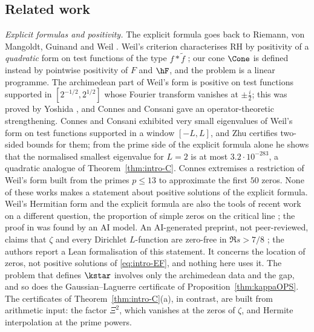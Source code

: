 \subsection{Related work}

\emph{Explicit formulas and positivity.} The explicit formula goes back to Riemann, von Mangoldt, Guinand \cite{Gui48,Gui49} and Weil
\cite{Wei52,Wei72}. Weil's criterion characterises RH by positivity of a \emph{quadratic} form on test functions of the type $f*\tilde f$
\cite{Wei52,Bom00}; our cone $\Cone$ is defined instead by pointwise positivity of $F$ and $\hF$, and the problem is a linear programme. The
archimedean part of Weil's form is positive on test functions supported in $[2^{-1/2},2^{1/2}]$ whose Fourier transform vanishes at
$\pm\frac i2$; this was proved by Yoshida \cite{Yos92}, and Connes and Consani \cite{CC21a} gave an operator-theoretic strengthening. Connes and
Consani \cite{CC23} exhibited very small eigenvalues of Weil's form on test functions supported in a window $[-L,L]$, and Zhu \cite{Zhu26}
certifies two-sided bounds for them; from the prime side of the explicit formula alone he shows that the normalised smallest eigenvalue
for $L=2$ is at most $3.2\cdot10^{-283}$, a quadratic analogue of Theorem~\ref{thm:intro-C}. Connes \cite{Con26} extremises a restriction
of Weil's form built from the primes $p\le13$ to approximate the first $50$ zeros. None of these works makes a statement about positive
solutions of the explicit formula. Weil's Hermitian form and the explicit formula are also the tools of recent work on a different
question, the proportion of simple zeros on the critical line \cite{AF26,Lam26}; the proof in \cite{AF26} was found by an AI model. An
AI-generated preprint, not peer-reviewed, claims that $\zeta$ and every Dirichlet $L$-function are zero-free in $\Re s>7/8$
\cite{OAI26qrh}; the authors report a Lean formalisation of this statement. It concerns the location of zeros, not positive solutions of
\eqref{eq:intro-EF}, and nothing here uses it. The problem that defines $\kstar$ involves only the archimedean data and the gap, and so does the Gaussian--Laguerre
certificate of Proposition~\ref{thm:kappaOPS}. The certificates of Theorem~\ref{thm:intro-C}(a), in contrast, are built from arithmetic
input: the factor $\Xi^2$, which vanishes at the zeros of $\zeta$, and Hermite interpolation at the prime powers.


